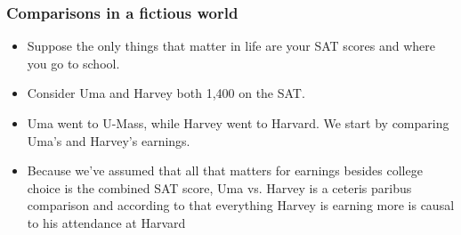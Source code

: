 \documentclass{beamer}
\begin{document}
\begin{frame}
\frametitle{Comparisons in a fictious world}
\begin{itemize}
	\item Suppose the only things that matter in life are your SAT scores and where you go to school.
	\item Consider Uma and Harvey both 1,400 on the SAT.
	\item Uma went to U-Mass, while Harvey went to Harvard. We start by comparing Uma’s and Harvey’s earnings.
	\item Because we’ve assumed that all that matters for earnings besides college choice is the combined SAT score, Uma vs. Harvey is a ceteris paribus comparison and according to that everything Harvey is earning more is causal to his attendance at Harvard
\end{itemize}
\end{frame}
\end{document}
